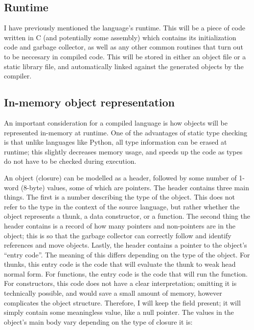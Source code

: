 \documentclass[9pt]{extarticle}
\begin{document}
\subsection{Runtime}

I have previously mentioned the language's runtime. This will be a piece
of code written in C (and potentially some assembly) which contains its
initialization code and garbage collector, as well as any other common
routines that turn out to be neccesary in compiled code. This will be
stored in either an object file or a static library file, and
automatically linked against the generated objects by the compiler.

\subsection{In-memory object representation}

An important consideration for a compiled language is how objects will
be represented in-memory at runtime. One of the advantages of static
type checking is that unlike languages like Python, all type information
can be erased at runtime; this slightly decreases memory usage, and
speeds up the code as types do not have to be checked during execution.

An object (closure) can be modelled as a header, followed by some number
of 1-word (8-byte) values, some of which are pointers. The header
contains three main things. The first is a number describing the type of
the object. This does not refer to the type in the context of the source
language, but rather whether the object represents a thunk, a data
constructor, or a function. The second thing the header contains is a
record of how many pointers and non-pointers are in the object; this is
so that the garbage collector can correctly follow and identify
references and move objects. Lastly, the header contains a pointer to
the object's ``entry code''. The meaning of this differs depending on
the type of the object. For thunks, this entry code is the code that
will evaluate the thunk to weak head normal form. For functions, the
entry code is the code that will run the function. For constructors,
this code does not have a clear interpretation; omitting it is
technically possible, and would save a small amount of memory, however
complicates the object structure. Therefore, I will keep the field
present; it will simply contain some meaningless value, like a null
pointer. The values in the object's main body vary depending on the type
of closure it is:
\end{document}
